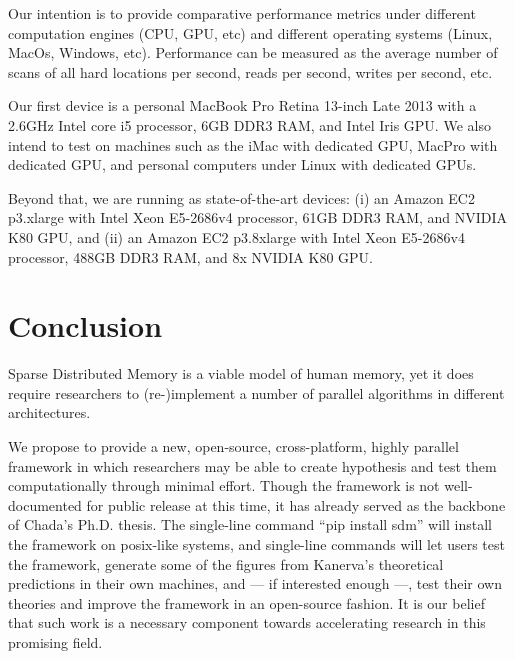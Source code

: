 Our intention is to provide comparative performance metrics under different computation engines (CPU, GPU, etc) and different operating systems (Linux, MacOs, Windows, etc). Performance can be measured as the average number of scans of all hard locations per second, reads per second, writes per second, etc.

Our first device is a personal MacBook Pro Retina 13-inch Late 2013 with a 2.6GHz Intel core i5 processor, 6GB DDR3 RAM, and Intel Iris GPU.  We also intend to test on machines such as the iMac with dedicated GPU, MacPro with dedicated GPU, and personal computers under Linux with dedicated GPUs.

Beyond that, we are running as state-of-the-art devices: (i) an Amazon EC2 p3.xlarge with Intel Xeon E5-2686v4 processor, 61GB DDR3 RAM, and NVIDIA K80 GPU, and (ii) an Amazon EC2 p3.8xlarge with Intel Xeon E5-2686v4 processor, 488GB DDR3 RAM, and 8x NVIDIA K80 GPU.


\chapter{Conclusion}
Sparse Distributed Memory is a viable model of human memory, yet it does require researchers to (re-)implement a number of parallel algorithms in different architectures.  

We propose to provide a new, open-source, cross-platform, highly parallel framework in which researchers may be able to create hypothesis and test them computationally through minimal effort. Though the framework is not well-documented for public release at this time, it has already served as the backbone of Chada's Ph.D. thesis. The single-line command ``pip install sdm'' will install the framework on posix-like systems, and single-line commands will let users test the framework, generate some of the figures from Kanerva's theoretical predictions in their own machines, and --- if interested enough ---, test their own theories and improve the framework in an open-source fashion. It is our belief that such work is a necessary component towards accelerating research in this promising field.


